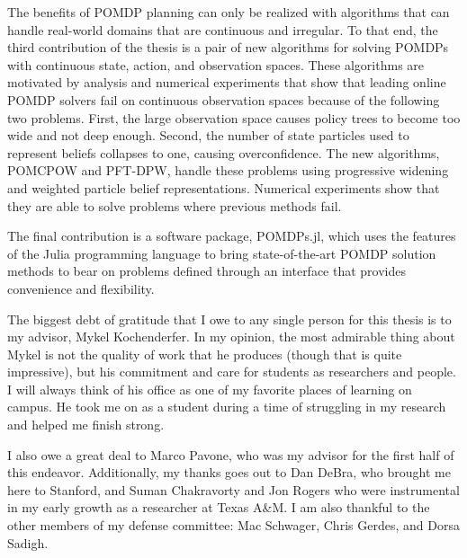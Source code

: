 \documentclass[12pt]{report}
\begin{document}
The benefits of POMDP planning can only be realized with algorithms that can handle real-world domains that are continuous and irregular.
To that end, the third contribution of the thesis is a pair of new algorithms for solving POMDPs with continuous state, action, and observation spaces.
These algorithms are motivated by analysis and numerical experiments that show that leading online POMDP solvers fail on continuous observation spaces because of the following two problems.
First, the large observation space causes policy trees to become too wide and not deep enough.
Second, the number of state particles used to represent beliefs collapses to one, causing overconfidence.
The new algorithms, POMCPOW and PFT-DPW, handle these problems using progressive widening and weighted particle belief representations.
Numerical experiments show that they are able to solve problems where previous methods fail.

The final contribution is a software package, POMDPs.jl, which uses the features of the Julia programming language to bring state-of-the-art POMDP solution methods to bear on problems defined through an interface that provides convenience and flexibility.



% 



The biggest debt of gratitude that I owe to any single person for this thesis is to my advisor, Mykel Kochenderfer.
In my opinion, the most admirable thing about Mykel is not the quality of work that he produces (though that is quite impressive), but his commitment and care for students as researchers and people.
I will always think of his office as one of my favorite places of learning on campus.
He took me on as a student during a time of struggling in my research and helped me finish strong.

I also owe a great deal to Marco Pavone, who was my advisor for the first half of this endeavor.
Additionally, my thanks goes out to Dan DeBra, who brought me here to Stanford, and Suman Chakravorty and Jon Rogers who were instrumental in my early growth as a researcher at Texas A\&M.
I am also thankful to the other members of my defense committee: Mac Schwager, Chris Gerdes, and Dorsa Sadigh.
\end{document}
